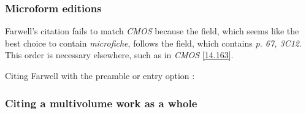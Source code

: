 \documentclass[11pt,letterpaper,oneside]{article}
\begin{document}

\begin{citebib}
\item \cite[152--53]{barzun1994}
\item \cite{bahadur2014}
\item \cite{schweitzer1966}
\end{citebib}

\subsubsection{Microform editions}

Farwell's citation fails to match \textit{CMOS} because the
 field, which seems like the best choice to
contain \textit{microfiche}, follows the  field,
which contains \textit{p. 67, 3C12}. This order is necessary
elsewhere, such as in \textit{CMOS} \ref{14.163}.

\begin{citebib}
\item \cite[p. 67, 3C12]{farwell1997}
\item \cite{tauber1958}
\end{citebib}

\noindent Citing Farwell with the preamble or entry option
:

\begin{citebib}
\item \cite[p. 67, 3C12]{farwell1997}
\end{citebib}

\setcounter{subsubsection}{116}
\subsubsection{Citing a multivolume work as a whole}
\label{14.117}

\begin{citebib}
\item \cite{aristotle1983}
\item \cite{byrne1981}
\item \cite{james1962}
\end{citebib}
\end{document}
